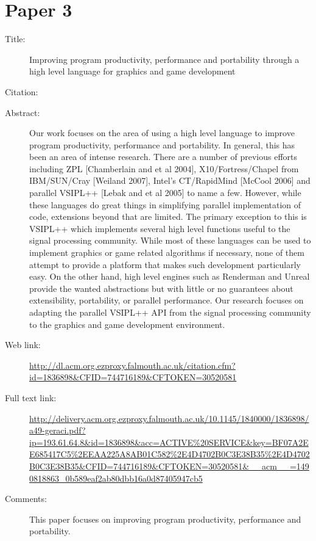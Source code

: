 \documentclass{scrartcl}
\begin{document}
\section*{Paper 3}
\begin{description}
\item[Title:] 
Improving program productivity, performance and portability through a high level language for graphics and game development
\item[Citation:] \cite{Geraci:2010:IPP:1836845.1836898}
\item[Abstract:] Our work focuses on the area of using a high level language to improve program productivity, performance and portability. In general, this has been an area of intense research. There are a number of previous efforts including ZPL [Chamberlain and et al 2004], X10/Fortress/Chapel from IBM/SUN/Cray [Weiland 2007], Intel's CT/RapidMind [McCool 2006] and parallel VSIPL++ [Lebak and et al 2005] to name a few. However, while these languages do great things in simplifying parallel implementation of code, extensions beyond that are limited. The primary exception to this is VSIPL++ which implements several high level functions useful to the signal processing community. While most of these languages can be used to implement graphics or game related algorithms if necessary, none of them attempt to provide a platform that makes such development particularly easy. On the other hand, high level engines such as Renderman and Unreal provide the wanted abstractions but with little or no guarantees about extensibility, portability, or parallel performance. Our research focuses on adapting the parallel VSIPL++ API from the signal processing community to the graphics and game development environment.
\item[Web link:] \url{http://dl.acm.org.ezproxy.falmouth.ac.uk/citation.cfm?id=1836898&CFID=744716189&CFTOKEN=30520581}
\item[Full text link:] \url{http://delivery.acm.org.ezproxy.falmouth.ac.uk/10.1145/1840000/1836898/a49-geraci.pdf?ip=193.61.64.8&id=1836898&acc=ACTIVE%20SERVICE&key=BF07A2EE685417C5%2EEAA225A8AB01C582%2E4D4702B0C3E38B35%2E4D4702B0C3E38B35&CFID=744716189&CFTOKEN=30520581&__acm__=1490818863_0b589eaf2ab80dbb16a0d87405947cb5}
\item[Comments:] This paper focuses on improving program productivity, performance and portability.
\end{description}
\end{document}
